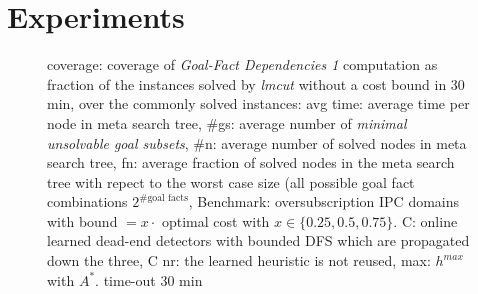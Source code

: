 


\newcommand{\scatterplotsize}{8cm}
\newcommand{\scatterplotxlabelshift}{1.5ex}
\newcommand{\scatterplotylabelshift}{-3ex}

\section{Experiments}





\setlength{\tabcolsep}{1pt}
\renewcommand{\arraystretch}{0.8}
\begin{figure}[ht]
	\centering
	
	\caption{
		coverage: coverage of \emph{Goal-Fact Dependencies 1} computation as fraction of the instances solved by \emph{lmcut} without a cost bound in 30 min, 
		over the commonly solved instances:
		avg time: average time per node in meta search tree,
		\#gs: average number of \emph{minimal unsolvable goal subsets},
		\#n: average number of solved nodes in meta search tree,
		fn: average fraction of solved nodes in the meta search tree with repect to the worst case size (all possible goal fact combinations $2^{\text{\# goal facts}}$, 
		Benchmark: oversubscription IPC 
		domains with bound $ = x \cdot $ optimal cost with $ x \in \{0.25, 0.5, 0.75\}$.
		C: online learned dead-end detectors with bounded DFS which are propagated 
		down the three, C nr: the learned heuristic is not reused, max: $h^{max}$ with $A^*$. 
		time-out 30 min}
\end{figure}


